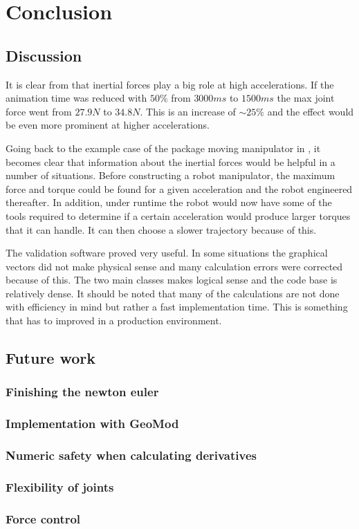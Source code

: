 \chapter{Conclusion}

\section{Discussion}

It is clear from  that inertial forces play a big role at high accelerations. If the animation time was reduced with $50\%$ from $3000ms$ to $1500ms$ the max joint force went from $27.9N$ to $34.8N$. This is an increase of $\sim 25\%$ and the effect would be even more prominent at higher accelerations.

Going back to the example case of the package moving manipulator in , it becomes clear that information about the inertial forces would be helpful in a number of situations. Before constructing a robot manipulator, the maximum force and torque could be found for a given acceleration and the robot engineered thereafter. In addition, under runtime the robot would now have some of the tools required to determine if a certain acceleration would produce larger torques that it can handle. It can then choose a slower trajectory because of this.

The validation software proved very useful. In some situations the graphical vectors did not make physical sense and many calculation errors were corrected because of this. The two main classes makes logical sense and the code base is relatively dense. It should be noted that many of the calculations are not done with efficiency in mind but rather a fast implementation time. This is something that has to improved in a production environment.

\section{Future work}
\subsection{Finishing the newton euler}
\subsection{Implementation with GeoMod}
\subsection{Numeric safety when calculating derivatives}
\subsection{Flexibility of joints}
\subsection{Force control}
